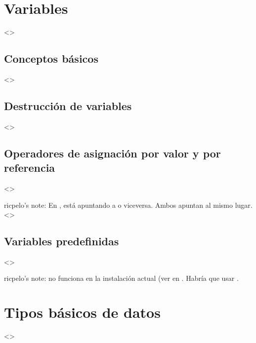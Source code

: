 \documentclass[a4paper,12pt,spanish]{sphinxmanual}
\begin{document}
\section{Variables}
\label{\detokenize{php:variables}}
\textless{}\textgreater{}


\subsection{Conceptos básicos}
\label{\detokenize{php:conceptos-basicos}}
\textless{}\textgreater{}


\subsection{Destrucción de variables}
\label{\detokenize{php:destruccion-de-variables}}
\textless{}\textgreater{}


\subsection{Operadores de asignación por valor y por referencia}
\label{\detokenize{php:operadores-de-asignacion-por-valor-y-por-referencia}}
\textless{}\textgreater{}

ricpelo’s note: En ,   está apuntando a 
o viceversa. Ambos apuntan al mismo
lugar. \textless{}\textgreater{}


\subsection{Variables predefinidas}
\label{\detokenize{php:variables-predefinidas}}
\textless{}\textgreater{}

ricpelo’s note:  no funciona en la instalación actual (ver
 en . Habría que usar .


\section{Tipos básicos de datos}
\label{\detokenize{php:tipos-basicos-de-datos}}
\textless{}\textgreater{}
\end{document}
